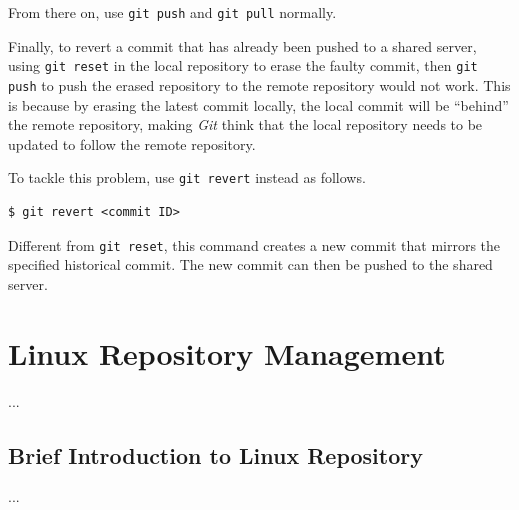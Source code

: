 From there on, use \verb|git push| and \verb|git pull| normally.

Finally, to revert a commit that has already been pushed to a shared server, using \verb|git reset| in the local repository to erase the faulty commit, then \verb|git push| to push the erased repository to the remote repository would not work. This is because by erasing the latest commit locally, the local commit will be ``behind'' the remote repository, making \textit{Git} think that the local repository needs to be updated to follow the remote repository.

To tackle this problem, use \verb|git revert| instead as follows.
\begin{lstlisting}
$ git revert <commit ID>
\end{lstlisting}
Different from \verb|git reset|, this command creates a new commit that mirrors the specified historical commit. The new commit can then be pushed to the shared server.

\section{Linux Repository Management}
...
\subsection{Brief Introduction to Linux Repository}
...













